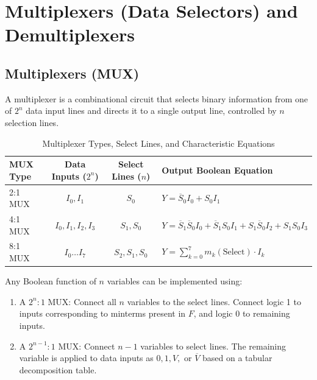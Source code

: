 \section{Multiplexers (Data Selectors) and Demultiplexers}
\subsection{Multiplexers (MUX)}
A multiplexer is a combinational circuit that selects binary information from one of $2^n$ data input lines and directs it to a single output line, controlled by $n$ selection lines.

\begin{table}[htbp]
\centering
\caption{Multiplexer Types, Select Lines, and Characteristic Equations}
\label{tab:mux-types}
\begin{tabularx}{\textwidth}{l c c X}
\toprule
\textbf{MUX Type} & \textbf{Data Inputs ($2^n$)} & \textbf{Select Lines ($n$)} & \textbf{Output Boolean Equation} \\
\midrule
2:1 MUX & $I_0, I_1$ & $S_0$ & $Y = \overline{S}_0 I_0 + S_0 I_1$ \\
4:1 MUX & $I_0, I_1, I_2, I_3$ & $S_1, S_0$ & $Y = \overline{S}_1\overline{S}_0 I_0 + \overline{S}_1 S_0 I_1 + S_1\overline{S}_0 I_2 + S_1 S_0 I_3$ \\
8:1 MUX & $I_0 \dots I_7$ & $S_2, S_1, S_0$ & $Y = \sum_{k=0}^7 m_k(\text{Select}) \cdot I_k$ \\
\bottomrule
\end{tabularx}
\end{table}

\begin{conceptbox}
Any Boolean function of $n$ variables can be implemented using:
\begin{enumerate}
    \item A $2^n : 1$ MUX: Connect all $n$ variables to the select lines. Connect logic 1 to inputs corresponding to minterms present in $F$, and logic 0 to remaining inputs.
    \item A $2^{n-1} : 1$ MUX: Connect $n-1$ variables to select lines. The remaining variable is applied to data inputs as $0, 1, V,$ or $\overline{V}$ based on a tabular decomposition table.
\end{enumerate}
\end{conceptbox}

